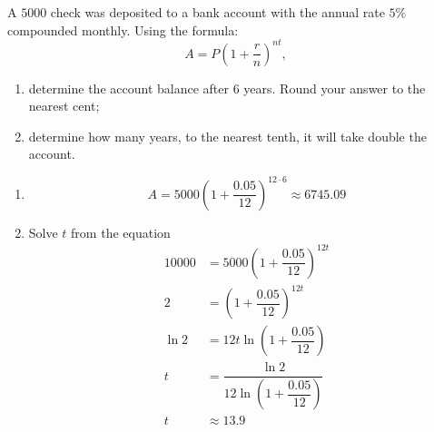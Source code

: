 






 A $5000$ check was deposited to a bank account with  the annual rate $5\%$ compounded monthly. Using the formula:
\[A=P\left(1+\dfrac rn\right)^{nt},\] 
\begin{enumerate}[label={(\arabic*)},afterlabel={\quad}]
\item determine the account balance after $6$ years. Round your answer to the nearest cent;
\item determine how many years, to the nearest tenth, it will take 
double the account. 
\end{enumerate}

\begin{solution}
\begin{enumerate}[label={(\arabic*)},afterlabel={\quad}]
\item 
\[A=5000\left(1+\dfrac{0.05}{12}\right)^{12\cdot 6}\approx 6745.09\]
\item Solve $t$ from the equation
\[
\begin{split}
10000&=5000\left(1+\dfrac{0.05}{12}\right)^{12t}\\
2&=\left(1+\dfrac{0.05}{12}\right)^{12t}\\
\ln2&=12t\ln\left(1+\dfrac{0.05}{12}\right)\\
t&=\dfrac{\ln2}{12\ln\left(1+\dfrac{0.05}{12}\right)}\\
t&\approx 13.9
\end{split}
\]
\end{enumerate}
\end{solution}
